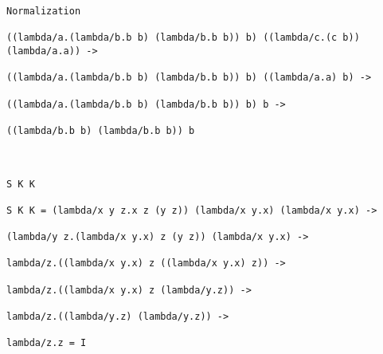 \documentclass{article}
\begin{document}
\begin{lstlisting}[language=Lambda]
Normalization

((lambda/a.(lambda/b.b b) (lambda/b.b b)) b) ((lambda/c.(c b)) (lambda/a.a)) ->

((lambda/a.(lambda/b.b b) (lambda/b.b b)) b) ((lambda/a.a) b) ->

((lambda/a.(lambda/b.b b) (lambda/b.b b)) b) b ->

((lambda/b.b b) (lambda/b.b b)) b



S K K

S K K = (lambda/x y z.x z (y z)) (lambda/x y.x) (lambda/x y.x) ->

(lambda/y z.(lambda/x y.x) z (y z)) (lambda/x y.x) ->

lambda/z.((lambda/x y.x) z ((lambda/x y.x) z)) ->

lambda/z.((lambda/x y.x) z (lambda/y.z)) ->

lambda/z.((lambda/y.z) (lambda/y.z)) ->

lambda/z.z = I

\end{lstlisting}
\end{document}
